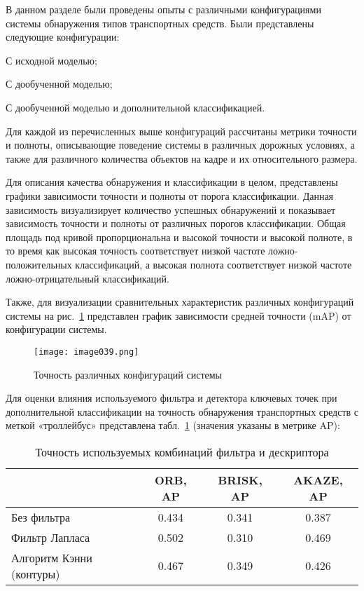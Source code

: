 В данном разделе были проведены опыты с различными конфигурациями системы обнаружения типов транспортных средств. Были представлены следующие конфигурации:

%
\begin{itemize*}
  \item С исходной моделью;
  \item С дообученной моделью;
  \item С дообученной моделью и дополнительной классификацией.	  
\end{itemize*}
%
	
Для каждой из перечисленных выше конфигураций рассчитаны метрики точности и полноты, описывающие поведение системы в различных дорожных условиях, а также для различного количества объектов на кадре и их относительного размера. 

Для описания качества обнаружения и классификации в целом, представлены графики зависимости точности и полноты от порога классификации. Данная зависимость визуализирует количество успешных обнаружений и показывает зависимость точности и полноты от различных порогов классификации. Общая площадь под кривой пропорциональна и высокой точности и высокой полноте, в то время как высокая точность соответствует низкой частоте ложно-положительных классификаций, а высокая полнота соответствует низкой частоте ложно-отрицательный классификаций. 

Также, для визуализации сравнительных характеристик различных конфигураций системы на рис.~\ref{fig:image039} представлен график зависимости средней точности (mAP) от конфигурации системы.

\begin{figure}[htbp]
\centering
\texttt{[image: image039.png]}
\caption{Точность различных конфигураций системы}%
\label{fig:image039}
\end{figure}

Для оценки влияния используемого фильтра и детектора ключевых точек при дополнительной классификации на точность обнаружения транспортных средств с меткой «троллейбус» представлена табл.~\ref{tabular:tab_5} (значения указаны в метрике AP):

\begin{table}[H]
	\caption{Точность используемых комбинаций фильтра и дескриптора}
	\begin{center}
		\begin{tabular}{|l|c|c|c|}
			\hline
			 & ORB, AP & BRISK, AP & AKAZE, AP\\ \hline
			Без фильтра & 0.434 & 0.341 & 0.387\\ \hline
			Фильтр Лапласа & 0.502 & 0.310 & 0.469\\ \hline
			Алгоритм Кэнни (контуры) & 0.467 & 0.349 & 0.426\\ \hline			
		\end{tabular}
		\label{tabular:tab_5}
	\end{center}
\end{table}

